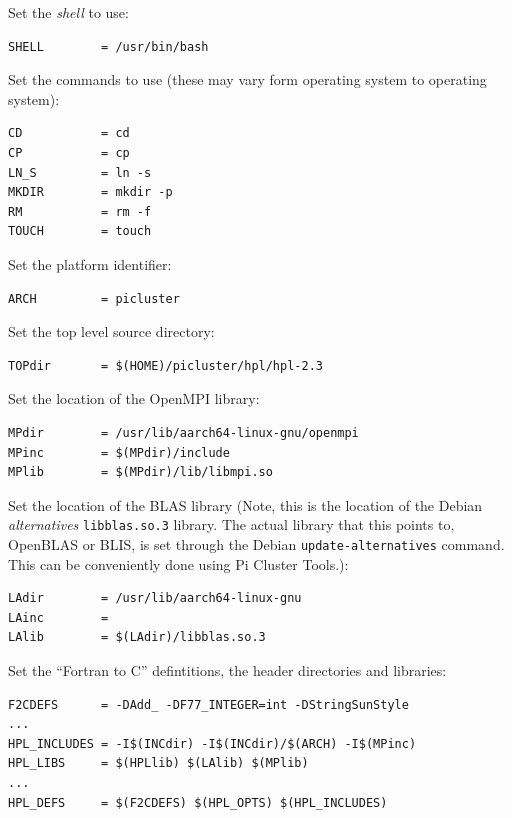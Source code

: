 \documentclass{report}
\begin{document}
Set the \emph{shell} to use:

\lstset{style=listing}
\begin{lstlisting}[numbers=none]  
SHELL        = /usr/bin/bash
\end{lstlisting}

Set the commands to use (these may vary form operating system to operating system):

\lstset{style=listing}
\begin{lstlisting}[numbers=none]  
CD           = cd
CP           = cp
LN_S         = ln -s
MKDIR        = mkdir -p
RM           = rm -f
TOUCH        = touch
\end{lstlisting}

Set the platform identifier:

\lstset{style=listing}
\begin{lstlisting}[numbers=none]  
ARCH         = picluster
\end{lstlisting}

Set the top level source directory:

\lstset{style=listing}
\begin{lstlisting}[numbers=none]  
TOPdir       = $(HOME)/picluster/hpl/hpl-2.3
\end{lstlisting}

Set the location of the OpenMPI library:

\lstset{style=listing}
\begin{lstlisting}[numbers=none]  
MPdir        = /usr/lib/aarch64-linux-gnu/openmpi
MPinc        = $(MPdir)/include
MPlib        = $(MPdir)/lib/libmpi.so
\end{lstlisting}

Set the location of the BLAS library (Note, this is the location of the Debian \emph{alternatives} \verb|libblas.so.3| library. The actual library that this points to, OpenBLAS or BLIS, is set through the Debian \verb|update-alternatives| command. This can be conveniently done using Pi Cluster Tools.):

\lstset{style=listing}
\begin{lstlisting}[numbers=none]  
LAdir        = /usr/lib/aarch64-linux-gnu
LAinc        =
LAlib        = $(LAdir)/libblas.so.3
\end{lstlisting}

Set the ``Fortran to C'' defintitions, the header directories and libraries: 

\lstset{style=listing}
\begin{lstlisting}[numbers=none]  
F2CDEFS      = -DAdd_ -DF77_INTEGER=int -DStringSunStyle
...
HPL_INCLUDES = -I$(INCdir) -I$(INCdir)/$(ARCH) -I$(MPinc)
HPL_LIBS     = $(HPLlib) $(LAlib) $(MPlib)
...
HPL_DEFS     = $(F2CDEFS) $(HPL_OPTS) $(HPL_INCLUDES)
\end{lstlisting}
\end{document}
